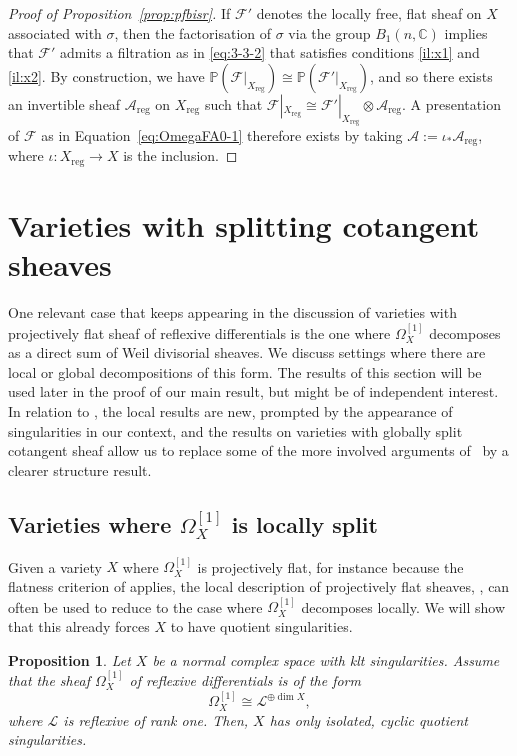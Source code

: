 \documentclass[JEP,XML,SOM,Unicode,published]{cedram}
\let\scr\mathscr
\theoremstyle{plain}
\newtheorem{prop}[thm]{Proposition}
\theoremstyle{definition}
\numberwithin{equation}{thm}
\numberwithin{enumi}{thm}
\newcommand{\reg}{\mathrm{reg}}
\newcommand{\sA}{\scr{A}}
\newcommand{\sF}{\scr{F}}
\newcommand{\sL}{\scr{L}}
\newcommand{\bC}{\mathbb{C}}
\newcommand{\bP}{\mathbb{P}}
\begin{document}
\begin{proof}[Proof of Proposition~\ref{prop:pfbisr}]
If $\sF'$ denotes the locally free, flat sheaf on $X$ associated with $\sigma$, then
the factorisation of $\sigma$ via the group $B_1(n, \bC)$ implies that $\sF'$ admits a
filtration as in \eqref{eq:3-3-2} that satisfies conditions \ref{il:x1} and
\ref{il:x2}. By construction, we have $\bP(\sF|_{X_{\reg}}) \cong \bP(\sF'|_{X_{\reg}})$,
and so there exists an invertible sheaf $\sA_{\reg}$ on $X_{\reg}$ such that
$\sF|_{X_{\reg}} \cong \sF'|_{X_{\reg}} \otimes \sA_{\reg}$. A presentation of $\sF$ as in
Equation~\eqref{eq:OmegaFA0-1} therefore exists by taking $\sA := \iota_* \sA_{\reg}$,
where $\iota : X_{\reg} \to X$ is the inclusion.
\end{proof}

\section{Varieties with splitting cotangent sheaves}
\label{sec:4}

One relevant case that keeps appearing in the discussion of varieties with
projectively flat sheaf of reflexive differentials is the one where $\Omega^{[1]}_X$
decomposes as a direct sum of Weil divisorial sheaves. We discuss settings
where there are local or global decompositions of this form. The results of
this section will be used later in the proof of our main result, but might be of
independent interest. In relation to \cite{MR3030068}, the local results are
new, prompted by the appearance of singularities in our context, and the results
on varieties with globally split cotangent sheaf allow us to replace some of the
more involved arguments of \loccit\ by a clearer structure result.

\subsection{Varieties where $\Omega^{[1]}_X$ is locally split}
\label{sect:split}

Given a variety $X$ where $\Omega^{[1]}_X$ is projectively flat, for instance because
the flatness criterion of \cite[Th.\,1.6]{GKP20a} applies, the local description
of projectively flat sheaves, \cite[Prop.\,3.11]{GKP20a}, can often be used to
reduce to the case where $\Omega^{[1]}_X$ decomposes locally. We will show that this
already forces $X$ to have quotient singularities.

\begin{prop}\label{prop:icq}
Let $X$ be a normal complex space with klt singularities. Assume that the
sheaf $\Omega^{[1]}_X$ of reflexive differentials is of the form
\begin{equation}\label{eq:icq}
\Omega^{[1]}_X \cong \sL^{\oplus \dim X},
\end{equation}
where $\sL$ is reflexive of rank one. Then, $X$ has only isolated, cyclic
quotient singularities.
\end{prop}
\end{document}
